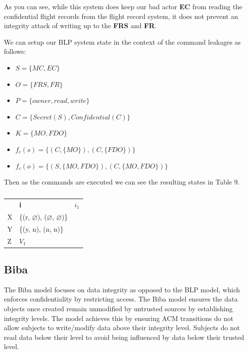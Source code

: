 \documentclass[10pt,journal,compsoc]{IEEEtran}
\begin{document}
As you can see, while this system does keep our bad actor \textbf{EC} from reading the confidential flight records from the flight record system, it does not prevent an integrity attack of writing up to the \textbf{FRS} and \textbf{FR}.

We can setup our BLP system state in the context of the command leakages as follows:

\begin{itemize}
  \item $S = \{MC, EC\}$
  \item $O = \{FRS, FR\}$
  \item $P = \{owner, read, write\}$
  \item $C = \{Secret (S), Confidential (C)\}$
  \item $K = \{MO, FDO\}$
  \item $f_c(s) = \{(C, \{MO\}), (C, \{FDO\})\}$
  \item $f_c(o) = \{(S, \{MO, FDO\}), (C, \{MO, FDO\})\}$
\end{itemize}

Then as the commands are executed we can see the resulting states in Table 9. 

\begin{table}[]
  \caption{}
  \label{tab:my-table}
  \begin{tabular}{lll}
  \textbf{} & \textbf{i}                                          & \textbf{$i_1$} \\
  X         & \{(r, $\varnothing$), ($\varnothing$, $\varnothing$)\} &                \\
  Y         & \{(y, n), (n, n)\}                                  &                \\
  Z         & $V_1$                                               &               
  \end{tabular}
  \end{table}

\subsection{Biba}

The Biba model focuses on data integrity as opposed to the BLP model, which enforces confidentiality by restricting access. The Biba model ensures the data objects once created remain unmodified by untrusted sources by establishing integrity levels. 
The model achieves this by ensuring ACM transitions do not allow subjects to write/modify data above their integrity level. Subjects do not read data below their level to avoid being influenced by data below their trusted level. 
\end{document}
